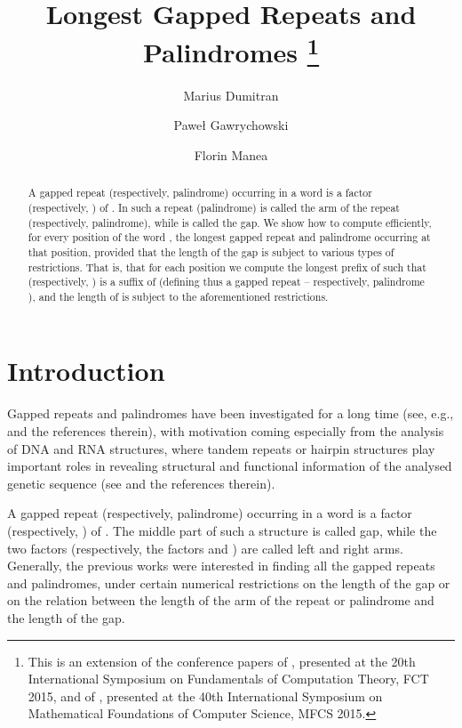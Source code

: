 \documentclass[final]{dmtcs-episciences}
\author{Marius Dumitran\affiliationmark{1} \and Pawe\l{} Gawrychowski\affiliationmark{2} \and Florin Manea\affiliationmark{3}}
\title[Longest Gapped Repeats and Palindromes]{Longest Gapped Repeats and Palindromes
\thanks{This is an extension of the conference papers of \cite{fct}, presented at the 20th International Symposium on
Fundamentals of Computation Theory, FCT 2015, and of \cite{mfcs}, presented at the 40th International Symposium on
Mathematical Foundations of Computer Science, MFCS 2015.}}
\affiliation{
  Faculty of Mathematics and Computer Science, University of Bucharest \\
  Institute of Computer Science, University of Wroc\l{}aw\\
  Department of Computer Science, Kiel University}
\begin{document}
\maketitle
\begin{abstract}
A gapped repeat (respectively, palindrome) occurring in a word  is a factor  (respectively, ) of . In such a repeat (palindrome)  is called the arm of the repeat (respectively, palindrome), while  is called the gap. 
We show how to compute efficiently, for every position  of the word , the longest gapped repeat and palindrome occurring at that position, provided that the length of the gap is subject to various types of restrictions. That is, that for each position  we compute the longest prefix  of  such that  (respectively, ) is a suffix of  (defining thus a gapped repeat  -- respectively, palindrome ), and the length of  is subject to the aforementioned restrictions.
\end{abstract}

\section{Introduction}
Gapped repeats and palindromes have been investigated for a long time (see, e.g., \cite{Gu97,Brodal,KK_SPIRE,KK09,KolpakovPPK14,power_of_SA,Cro2011} and the references therein), with motivation coming especially from the analysis of DNA and RNA structures, where tandem repeats or hairpin structures play important roles in revealing structural and functional information of the analysed genetic sequence (see \cite{Gu97,Brodal,KK09} and the references therein). 

A gapped repeat (respectively, palindrome) occurring in a word  is a factor  (respectively, ) of . The middle part  of such a structure is called gap, while the two factors  (respectively, the factors  and ) are called left and right arms. Generally, the previous works were interested in finding all the gapped repeats and palindromes, under certain numerical restrictions on the length of the gap or on the relation between the length of the arm of the repeat or palindrome and the length of the gap.
\end{document}
